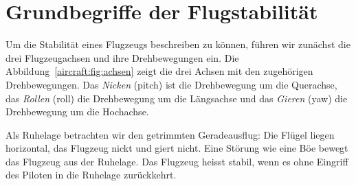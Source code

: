 %
%
%
%


\section{Grundbegriffe der Flugstabilität
\label{aircraft:section:1-grundbegriffe}}
Um die Stabilität eines Flugzeugs beschreiben zu können, führen wir zunächst
die drei Flugzeugachsen und ihre Drehbewegungen ein.
Die Abbildung~\ref{aircraft:fig:achsen} zeigt die drei Achsen mit den
zugehörigen Drehbewegungen.
Das \emph{Nicken} (pitch) ist die Drehbewegung um die Querachse, das
\emph{Rollen} (roll) die Drehbewegung um die Längsachse und das \emph{Gieren}
(yaw) die Drehbewegung um die Hochachse.

Als Ruhelage betrachten wir den getrimmten Geradeausflug:
Die Flügel liegen horizontal, das Flugzeug nickt und giert nicht.
Eine Störung wie eine Böe bewegt das Flugzeug aus der Ruhelage.
Das Flugzeug heisst stabil, wenn es ohne Eingriff des Piloten in die
Ruhelage zurückkehrt.

